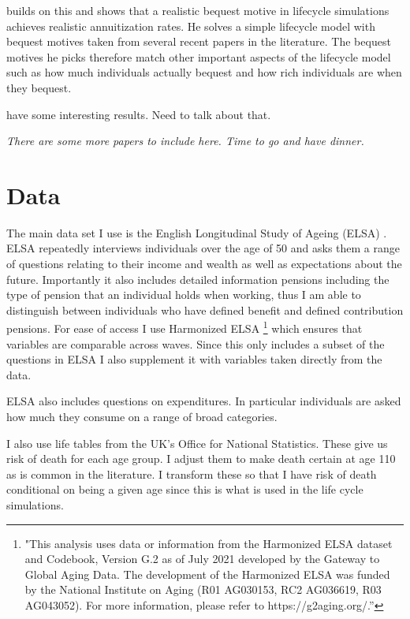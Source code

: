\documentclass[12pt]{article}
\begin{document}
\cite{lockwood_red_2012} builds on this and shows that a realistic bequest motive in lifecycle simulations achieves
realistic annuitization rates. He solves a simple lifecycle model with bequest motives taken from several recent papers
in the literature. The bequest motives he picks therefore match other important aspects of the lifecycle model such
as how much individuals actually bequest and how rich individuals are when they bequest.

\cite{lockwood_aer_2018} 

\cite{vidalmelia_lejarragagarcia_munich_2004} have some interesting results. Need to talk about that.

\textit{There are some more papers to include here. Time to go and have dinner. }

\section{Data}
The main data set I use is the English Longitudinal Study of Ageing (ELSA) \cite{main_elsa_citation}. ELSA repeatedly interviews
individuals over the age of 50 and asks them a range of questions relating to their income and wealth as well as expectations about
the future. Importantly it also includes detailed information pensions including the type of pension that an individual holds when
working, thus I am able to distinguish between individuals who have defined benefit and defined contribution pensions. For ease of access
I use Harmonized ELSA \footnote{"This analysis uses data or information from the Harmonized ELSA dataset and Codebook, Version G.2 as of
  July 2021 developed by the Gateway to Global Aging Data. The development of the Harmonized ELSA was funded by the National
  Institute on Aging (R01 AG030153, RC2 AG036619, R03 AG043052). For more information,
  please refer to https://g2aging.org/.”} which ensures that variables are comparable across waves. Since this only includes a
subset of the questions in ELSA I also supplement it with variables taken directly from the data.

ELSA also includes questions on expenditures. In particular individuals are asked how much they consume on a range of broad categories. 



I also use life tables from the UK's Office for National Statistics. These give us risk of death for each age group. I adjust them 
to make death certain at age 110 as is common in the literature. I transform these so that I have risk of death conditional on being
a given age since this is what is used in the life cycle simulations.  
\end{document}
